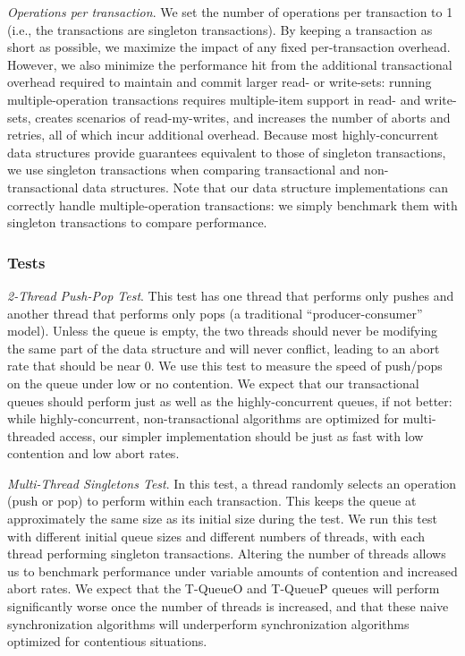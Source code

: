 \emph{Operations per transaction}. We set the number of operations per transaction to 1 (i.e., the transactions are singleton transactions). By keeping a transaction as short as possible, we maximize the impact of any fixed per-transaction overhead. However, we also minimize the performance hit from the additional transactional overhead required to maintain and commit larger read- or write-sets: running multiple-operation transactions requires multiple-item support in read- and write-sets, creates scenarios of read-my-writes, and increases the number of aborts and retries, all of which incur additional overhead. 
Because most highly-concurrent data structures provide guarantees equivalent to those of singleton transactions, we use singleton transactions when comparing transactional and non-transactional data structures.
Note that our data structure implementations can correctly handle multiple-operation transactions: we simply benchmark them with singleton transactions to compare performance.

\subsubsection{Tests}
    \emph{2-Thread Push-Pop Test}. This test has one thread that performs only pushes and another thread that performs only pops (a traditional ``producer-consumer'' model). Unless the queue is empty, the two threads should never be modifying the same part of the data structure and will never conflict, leading to an abort rate that should be near 0. We use this test to measure the speed of push/pops on the queue under low or no contention. We expect that our transactional queues should perform just as well as the highly-concurrent queues, if not better: while highly-concurrent, non-transactional algorithms are optimized for multi-threaded access, our simpler implementation should be just as fast with low contention and low abort rates.

\emph{Multi-Thread Singletons Test}.
    In this test, a thread randomly selects an operation (push or pop) to perform within each transaction. This keeps the queue at approximately the same size as its initial size during the test. We run this test with different initial queue sizes and different numbers of threads, with each thread performing singleton transactions. Altering the number of threads allows us to benchmark performance under variable amounts of contention and increased abort rates. We expect that the T-QueueO and T-QueueP queues will perform significantly worse once the number of threads is increased, and that these naive synchronization algorithms will underperform synchronization algorithms optimized for contentious situations.

